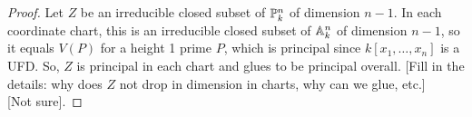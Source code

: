 \begin{proof}
	Let $Z$ be an irreducible closed subset of $\PP_k^n$ of dimension $n-1$. In each coordinate chart, this is an irreducible closed subset of $\AA_k^n$ of dimension $n-1$, so it equals $V(P)$ for a height 1 prime $P$, which is principal since $k[x_1,\ldots,x_n]$ is a UFD. So, $Z$ is principal in each chart and glues to be principal overall. [Fill in the details: why does $Z$ not drop in dimension in charts, why can we glue, etc.] \\
	
	[Not sure].
\end{proof}
